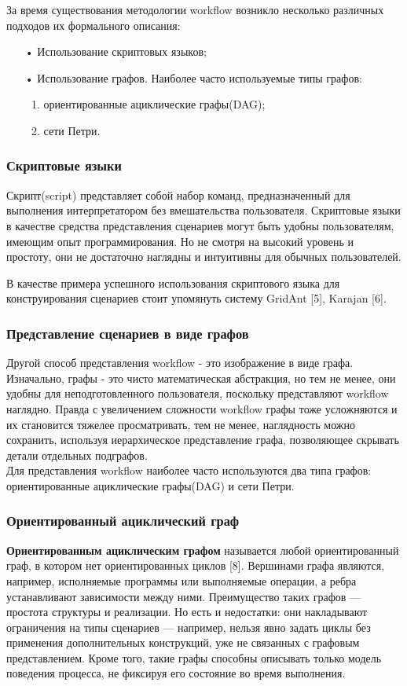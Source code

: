 \documentclass[koi8-r,usehyperref,12pt]{G7-32}
\begin{document}
За время существования методологии workflow возникло несколько различных подходов их формального описания:
\begin{enumerate}
\item[•] Использование скриптовых языков;

\item[•] Использование графов. Наиболее часто используемые типы графов:
	\begin{enumerate}
		\item ориентированные ациклические графы(DAG);
		\item сети Петри.
	\end{enumerate}
\end{enumerate}
\subsubsection{Скриптовые языки}
Скрипт(script) представляет собой набор команд, предназначенный для выполнения интерпретатором без вмешательства пользователя. 
 Скриптовые языки в качестве средства представления сценариев могут быть удобны пользователям, имеющим опыт программирования. Но не смотря на высокий уровень и простоту, они не достаточно наглядны и интуитивны для обычных пользователей.
 
В качестве примера успешного использования скриптового языка для
конструирования сценариев стоит упомянуть систему GridAnt [5], Karajan [6].
 
 
\subsubsection{Представление сценариев в виде графов}
Другой способ представления workflow  - это изображение в виде графа. Изначально, графы - это чисто математическая абстракция, но тем не менее, они удобны для неподготовленного пользователя, поскольку представляют workflow наглядно.
Правда с увеличением сложности workflow графы тоже усложняются и их становится тяжелее просматривать, тем не менее, наглядность можно сохранить, используя иерархическое представление графа, позволяющее скрывать детали отдельных подграфов.\\
Для представления workflow наиболее часто используются два типа графов:
ориентированные ациклические графы(DAG) и сети Петри.

\subsubsection{Ориентированный ациклический граф}
\textbf{Ориентированным ациклическим графом} называется любой ориентированный граф, в котором нет ориентированных циклов [8]. Вершинами графа являются, например, исполняемые программы или выполняемые операции, а ребра устанавливают зависимости между ними.
Преимущество таких графов — простота структуры и реализации. Но есть
и недостатки: они накладывают ограничения на типы сценариев — например, нельзя явно задать циклы без применения дополнительных конструкций, уже не связанных с графовым представлением. Кроме того, такие графы способны описывать только модель поведения процесса, не фиксируя его состояние во время выполнения.
\end{document}
